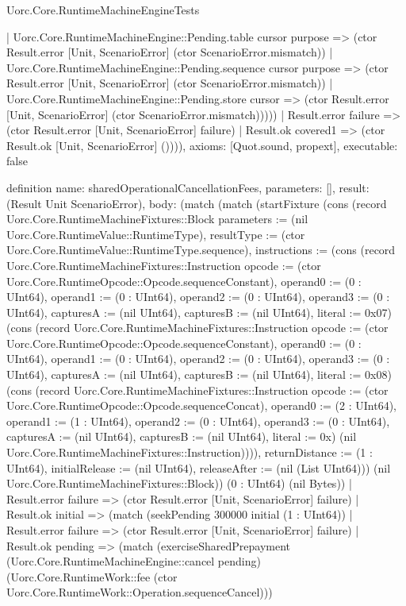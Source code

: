 \begin{lexlean}{Uorc.Core.RuntimeMachineEngineTests}
\begin{semanticmodule}
{            | Uorc.Core.RuntimeMachineEngine::Pending.table cursor purpose => (ctor Result.error [Unit, ScenarioError] (ctor ScenarioError.mismatch))
            | Uorc.Core.RuntimeMachineEngine::Pending.sequence cursor purpose => (ctor Result.error [Unit, ScenarioError] (ctor ScenarioError.mismatch))
            | Uorc.Core.RuntimeMachineEngine::Pending.store cursor => (ctor Result.error [Unit, ScenarioError] (ctor ScenarioError.mismatch)))))
      | Result.error failure => (ctor Result.error [Unit, ScenarioError] failure)
      | Result.ok covered1 => (ctor Result.ok [Unit, ScenarioError] ()))),
  axioms: [Quot.sound, propext],
  executable: false
}

definition{
  name: sharedOperationalCancellationFees,
  parameters: [],
  result: (Result Unit ScenarioError),
  body: (match (match (startFixture (cons (record Uorc.Core.RuntimeMachineFixtures::Block {parameters := (nil Uorc.Core.RuntimeValue::RuntimeType), resultType := (ctor Uorc.Core.RuntimeValue::RuntimeType.sequence), instructions := (cons (record Uorc.Core.RuntimeMachineFixtures::Instruction {opcode := (ctor Uorc.Core.RuntimeOpcode::Opcode.sequenceConstant), operand0 := (0 : UInt64), operand1 := (0 : UInt64), operand2 := (0 : UInt64), operand3 := (0 : UInt64), capturesA := (nil UInt64), capturesB := (nil UInt64), literal := 0x07}) (cons (record Uorc.Core.RuntimeMachineFixtures::Instruction {opcode := (ctor Uorc.Core.RuntimeOpcode::Opcode.sequenceConstant), operand0 := (0 : UInt64), operand1 := (0 : UInt64), operand2 := (0 : UInt64), operand3 := (0 : UInt64), capturesA := (nil UInt64), capturesB := (nil UInt64), literal := 0x08}) (cons (record Uorc.Core.RuntimeMachineFixtures::Instruction {opcode := (ctor Uorc.Core.RuntimeOpcode::Opcode.sequenceConcat), operand0 := (2 : UInt64), operand1 := (1 : UInt64), operand2 := (0 : UInt64), operand3 := (0 : UInt64), capturesA := (nil UInt64), capturesB := (nil UInt64), literal := 0x}) (nil Uorc.Core.RuntimeMachineFixtures::Instruction)))), returnDistance := (1 : UInt64), initialRelease := (nil UInt64), releaseAfter := (nil (List UInt64))}) (nil Uorc.Core.RuntimeMachineFixtures::Block)) (0 : UInt64) (nil Bytes))
      | Result.error failure => (ctor Result.error [Unit, ScenarioError] failure)
      | Result.ok initial => (match (seekPending 300000 initial (1 : UInt64))
        | Result.error failure => (ctor Result.error [Unit, ScenarioError] failure)
        | Result.ok pending => (match (exerciseSharedPrepayment (Uorc.Core.RuntimeMachineEngine::cancel pending) (Uorc.Core.RuntimeWork::fee (ctor Uorc.Core.RuntimeWork::Operation.sequenceCancel)))
}
\end{semanticmodule}
\end{lexlean}
